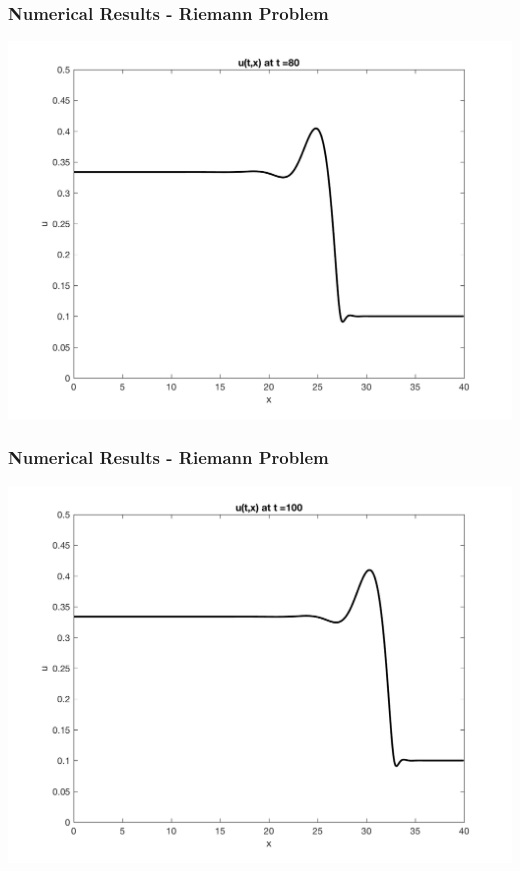 \documentclass[10pt]{beamer}
\begin{document}
    \begin{frame}
      \frametitle{Numerical Results - Riemann Problem}
      \begin{center}
        \includegraphics[scale=0.5]{Figures/reimann80.png}
      \end{center}
    \end{frame}
    \begin{frame}
      \frametitle{Numerical Results - Riemann Problem}
      \begin{center}
        \includegraphics[scale=0.5]{Figures/reimann100.png}
      \end{center}
    \end{frame}
\end{document}
